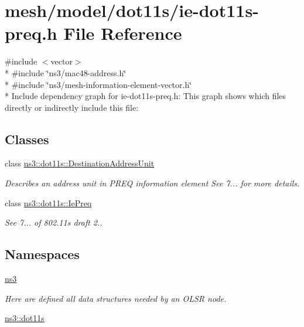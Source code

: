 \hypertarget{ie-dot11s-preq_8h}{}\section{mesh/model/dot11s/ie-\/dot11s-\/preq.h File Reference}
\label{ie-dot11s-preq_8h}
{\ttfamily \#include $<$vector$>$}\\*
{\ttfamily \#include \char`\"{}ns3/mac48-\/address.\+h\char`\"{}}\\*
{\ttfamily \#include \char`\"{}ns3/mesh-\/information-\/element-\/vector.\+h\char`\"{}}\\*
Include dependency graph for ie-\/dot11s-\/preq.h\+:
This graph shows which files directly or indirectly include this file\+:
\subsection*{Classes}
\begin{DoxyCompactItemize}
\item 
class \hyperlink{classns3_1_1dot11s_1_1DestinationAddressUnit}{ns3\+::dot11s\+::\+Destination\+Address\+Unit}
\begin{DoxyCompactList}\small\item\em Describes an address unit in P\+R\+EQ information element See 7... for more details. \end{DoxyCompactList}\item 
class \hyperlink{classns3_1_1dot11s_1_1IePreq}{ns3\+::dot11s\+::\+Ie\+Preq}
\begin{DoxyCompactList}\small\item\em See 7... of 802.\+11s draft 2.. \end{DoxyCompactList}\end{DoxyCompactItemize}
\subsection*{Namespaces}
\begin{DoxyCompactItemize}
\item 
 \hyperlink{namespacens3}{ns3}
\begin{DoxyCompactList}\small\item\em Here are defined all data structures needed by an O\+L\+SR node. \end{DoxyCompactList}\item 
 \hyperlink{namespacens3_1_1dot11s}{ns3\+::dot11s}
\end{DoxyCompactItemize}
